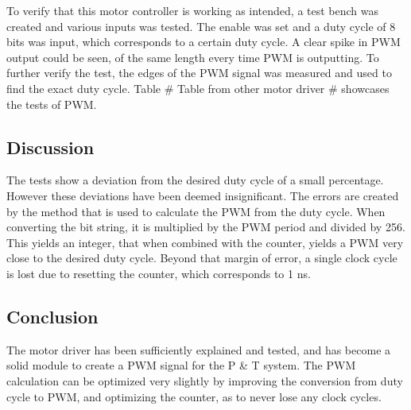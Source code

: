 To verify that this motor controller is working as intended, a test bench was created and various inputs was tested. The enable was set and a duty cycle of 8 bits was input, which corresponds to a certain duty cycle. A clear spike in PWM output could be seen, of the same length every time PWM is outputting.
To further verify the test, the edges of the PWM signal was measured and used to find the exact duty cycle. Table \# Table from other motor driver \# showcases the tests of PWM.

\subsection{Discussion}

The tests show a deviation from the desired duty cycle of a small percentage. However these deviations have been deemed insignificant. The errors are created by the method that is used to calculate the PWM from the duty cycle. When converting the bit string, it is multiplied by the PWM period and divided by 256. This yields an integer, that when combined with the counter, yields a PWM very close to the desired duty cycle. Beyond that margin of error, a single clock cycle is lost due to resetting the counter, which corresponds to 1 ns.


\subsection{Conclusion}

The motor driver has been sufficiently explained and tested, and has become a solid module to create a PWM signal for the P \& T system. The PWM calculation can be optimized very slightly by improving the conversion from duty cycle to PWM, and optimizing the counter, as to never lose any clock cycles.
